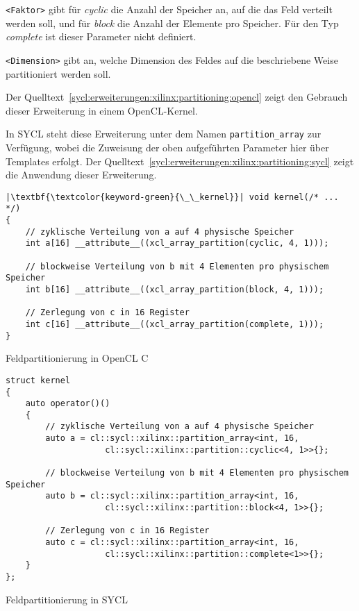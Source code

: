 \texttt{<Faktor>} gibt für \textit{cyclic} die Anzahl der Speicher an, auf die
das Feld verteilt werden soll, und für \textit{block} die Anzahl der Elemente
pro Speicher. Für den Typ \textit{complete} ist dieser Parameter nicht
definiert. \cite[vgl.][17]{sdxpragma2019}

\texttt{<Dimension>} gibt an, welche Dimension des Feldes auf die beschriebene
Weise partitioniert werden soll. \cite[vgl.][17]{sdxpragma2019}

Der Quelltext~\ref{sycl:erweiterungen:xilinx:partitioning:opencl} zeigt den
Gebrauch dieser Erweiterung in einem OpenCL-Kernel.

In SYCL steht diese Erweiterung unter dem Namen \texttt{partition\_array} zur
Verfügung, wobei die Zuweisung der oben aufgeführten Parameter hier über
Templates erfolgt. Der
Quelltext~\ref{sycl:erweiterungen:xilinx:partitioning:sycl} zeigt die Anwendung
dieser Erweiterung.

\begin{code}
    \begin{verbatim}
|\textbf{\textcolor{keyword-green}{\_\_kernel}}| void kernel(/* ... */)
{
    // zyklische Verteilung von a auf 4 physische Speicher
    int a[16] __attribute__((xcl_array_partition(cyclic, 4, 1)));

    // blockweise Verteilung von b mit 4 Elementen pro physischem Speicher
    int b[16] __attribute__((xcl_array_partition(block, 4, 1)));

    // Zerlegung von c in 16 Register
    int c[16] __attribute__((xcl_array_partition(complete, 1)));
}
    \end{verbatim}
    \caption{Feldpartitionierung in OpenCL C}
    \label{sycl:erweiterungen:xilinx:partitioning:opencl}
\end{code}

\begin{code}
    \begin{verbatim}
struct kernel
{
    auto operator()()
    {
        // zyklische Verteilung von a auf 4 physische Speicher
        auto a = cl::sycl::xilinx::partition_array<int, 16,
                    cl::sycl::xilinx::partition::cyclic<4, 1>>{};

        // blockweise Verteilung von b mit 4 Elementen pro physischem Speicher
        auto b = cl::sycl::xilinx::partition_array<int, 16,
                    cl::sycl::xilinx::partition::block<4, 1>>{};

        // Zerlegung von c in 16 Register
        auto c = cl::sycl::xilinx::partition_array<int, 16,
                    cl::sycl::xilinx::partition::complete<1>>{};
    }
};
    \end{verbatim}
    \caption{Feldpartitionierung in SYCL}
    \label{sycl:erweiterungen:xilinx:partitioning:sycl}
\end{code}
